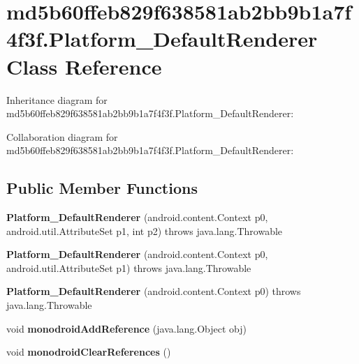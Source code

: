 \hypertarget{classmd5b60ffeb829f638581ab2bb9b1a7f4f3f_1_1_platform___default_renderer}{}\section{md5b60ffeb829f638581ab2bb9b1a7f4f3f.\+Platform\+\_\+\+Default\+Renderer Class Reference}
\label{classmd5b60ffeb829f638581ab2bb9b1a7f4f3f_1_1_platform___default_renderer}


Inheritance diagram for md5b60ffeb829f638581ab2bb9b1a7f4f3f.\+Platform\+\_\+\+Default\+Renderer\+:


Collaboration diagram for md5b60ffeb829f638581ab2bb9b1a7f4f3f.\+Platform\+\_\+\+Default\+Renderer\+:
\subsection*{Public Member Functions}
\begin{DoxyCompactItemize}
\item 
\mbox{\label{classmd5b60ffeb829f638581ab2bb9b1a7f4f3f_1_1_platform___default_renderer_aeafd2a9469465843c186a31ab7c6f1fa}} 
{\bfseries Platform\+\_\+\+Default\+Renderer} (android.\+content.\+Context p0, android.\+util.\+Attribute\+Set p1, int p2)  throws java.\+lang.\+Throwable 	
\item 
\mbox{\label{classmd5b60ffeb829f638581ab2bb9b1a7f4f3f_1_1_platform___default_renderer_abbbf33e1c50423f6b442efed5224ebec}} 
{\bfseries Platform\+\_\+\+Default\+Renderer} (android.\+content.\+Context p0, android.\+util.\+Attribute\+Set p1)  throws java.\+lang.\+Throwable 	
\item 
\mbox{\label{classmd5b60ffeb829f638581ab2bb9b1a7f4f3f_1_1_platform___default_renderer_a3e7015303f57b219dad7b8abd32e2070}} 
{\bfseries Platform\+\_\+\+Default\+Renderer} (android.\+content.\+Context p0)  throws java.\+lang.\+Throwable 	
\item 
\mbox{\label{classmd5b60ffeb829f638581ab2bb9b1a7f4f3f_1_1_platform___default_renderer_a799e1dac7b8eb2dce35fe56b86695b9d}} 
void {\bfseries monodroid\+Add\+Reference} (java.\+lang.\+Object obj)
\item 
\mbox{\label{classmd5b60ffeb829f638581ab2bb9b1a7f4f3f_1_1_platform___default_renderer_a27a3fcd4a55447ba5df4a3eef8c52982}} 
void {\bfseries monodroid\+Clear\+References} ()
\end{DoxyCompactItemize}
